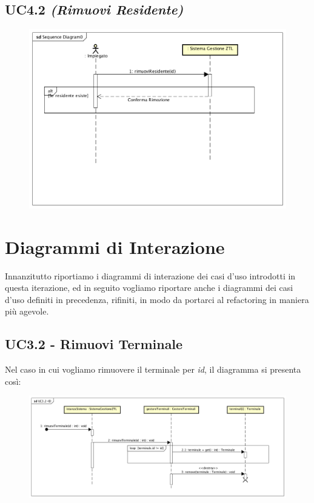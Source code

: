 \documentclass[12pt, letterpaper]{article}
\begin{document}
\subsection{UC4.2 \emph{(Rimuovi Residente)}}
\begin{figure}[H]
    \centering
    \includegraphics[scale=0.40]{UC4.2-SSD}
    \label{fig:mesh1}
\end{figure}

\section{Diagrammi di Interazione}
Innanzitutto riportiamo i diagrammi di 
interazione dei casi d'uso introdotti in 
questa iterazione, ed in seguito vogliamo 
riportare anche i diagrammi dei casi 
d'uso definiti in precedenza, rifiniti,
in modo da portarci al refactoring in 
maniera più agevole.

\subsection{UC3.2 - Rimuovi Terminale}
Nel caso in cui vogliamo rimuovere il 
terminale per \emph{id}, il diagramma 
si presenta così:
\begin{figure}[H]
    \centering
    \includegraphics[scale=0.30]{UC3.2-DI-ID}
    \label{fig:mesh1}
\end{figure}
\end{document}
